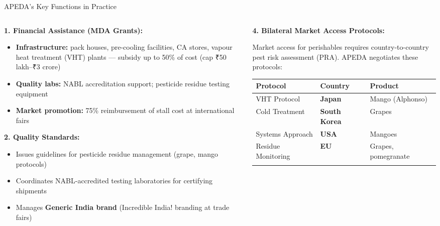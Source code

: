 \documentclass[
  ignorenonframetext,
  aspectratio=169,
]{beamer}
\makeatletter
\providecommand{\tightlist}{%
  \setlength{\itemsep}{0pt}\setlength{\parskip}{0pt}}
\let\quarto@originallabel\label
\DeclareRobustCommand*{\label}[1]{\quarto@originallabel{#1}}
\makeatother
\begin{document}
\begin{frame}{APEDA's Key Functions in Practice}
\label{apedas-key-functions-in-practice}
\begin{columns}[T]
\begin{column}{0.5\linewidth}
\textbf{1. Financial Assistance (MDA Grants):}

\begin{itemize}
\tightlist
\item
  \textbf{Infrastructure:} pack houses, pre-cooling facilities, CA
  stores, vapour heat treatment (VHT) plants --- subsidy up to 50\% of
  cost (cap ₹50 lakh--₹3 crore)
\item
  \textbf{Quality labs:} NABL accreditation support; pesticide residue
  testing equipment
\item
  \textbf{Market promotion:} 75\% reimbursement of stall cost at
  international fairs
\end{itemize}

\textbf{2. Quality Standards:}

\begin{itemize}
\tightlist
\item
  Issues guidelines for pesticide residue management (grape, mango
  protocols)
\item
  Coordinates NABL-accredited testing laboratories for certifying
  shipments
\item
  Manages \textbf{Generic India brand} (Incredible India! branding at
  trade fairs)
\end{itemize}
\end{column}

\begin{column}{0.5\linewidth}
\textbf{4. Bilateral Market Access Protocols:}

Market access for perishables requires country-to-country pest risk
assessment (PRA). APEDA negotiates these protocols:

\begin{longtable}[]{@{}lll@{}}
\toprule\noalign{}
Protocol & Country & Product \\
\midrule\noalign{}
\endhead
VHT Protocol & \textbf{Japan} & Mango (Alphonso) \\
Cold Treatment & \textbf{South Korea} & Grapes \\
Systems Approach & \textbf{USA} & Mangoes \\
Residue Monitoring & \textbf{EU} & Grapes, pomegranate \\
\bottomrule\noalign{}
\end{longtable}


\end{column}
\end{columns}
\end{frame}
\end{document}
